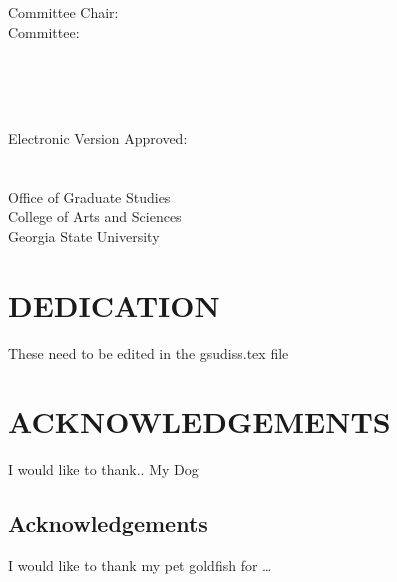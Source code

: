 \documentclass[12pt]{report}
\begin{document}
  \hspace{0.33\textwidth}
  \begin{minipage}[t]{0.33\textwidth}
  Committee Chair:\\
  Committee: \\
  \end{minipage}%
  \begin{minipage}[t]{0.33\textwidth}
  \begin{flushright}
   \\
   \\
   \\
  \end{flushright}
  \end{minipage}%
  \vspace{1cm}

  \parbox[b]{\textwidth}{
  Electronic Version Approved:\\\\\\
  Office of Graduate Studies\\
  College of Arts and Sciences\\
  Georgia State University\\
   
  }


\setcounter{page}{4}

\chapter*{DEDICATION}
  These need to be edited in the gsudiss.tex file

\chapter*{ACKNOWLEDGEMENTS}

  I would like to thank.. My Dog


\tableofcontents
\newpage

{}
\listoftables
\newpage

{}
\listoffigures
\newpage

\cleardoublepage
{}

\newpage

\hypertarget{acknowledgements}{%
\section*{Acknowledgements}\label{acknowledgements}}

I would like to thank my pet goldfish for \ldots{}

{}

\newpage



		
\end{document}
